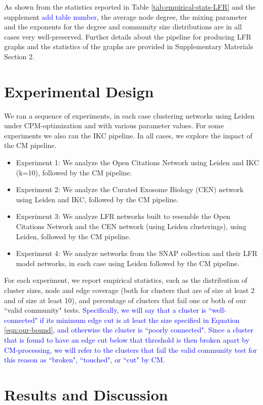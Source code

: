 \documentclass[11pt]{article}   	%
\begin{document}
As shown from the statistics reported in Table \ref{tab:empirical-stats-LFR} and the supplement \textcolor{blue}{add table number}, the average node degree, the mixing parameter and the exponents for the degree and community size distributions are in all cases very well-preserved. Further details about the pipeline for producing LFR graphs and the statistics of the graphs are provided in Supplementary Materials Section 2.

\section{Experimental Design}
\label{sec:expt-design}
We ran a sequence of experiments, in each case clustering networks using Leiden under CPM-optimization and with various parameter values. For some experiments we also ran the IKC pipeline.  In all cases, we explore the impact of the CM pipeline.
\begin{itemize}
\item Experiment 1: We analyze the Open Citations Network using Leiden  and IKC (k=10), followed by the CM pipeline.
\item Experiment 2: We analyze the Curated Exosome Biology (CEN) network using Leiden and IKC, followed by the CM pipeline.
\item Experiment 3: We analyze LFR networks built to resemble the Open Citations Network and the CEN network (using Leiden clusterings), using Leiden, followed by the CM pipeline.
\item Experiment 4: We analyze networks from the SNAP collection and their LFR model networks, in each case using Leiden followed by the CM pipeline.
\end{itemize}

For each experiment, we report empirical statistics, such as the distribution of cluster sizes, node and edge coverage (both for clusters that are of size at least 2 and of size at least 10), and percentage of clusters that fail one  or both of our ``valid community" tests.
\textcolor{blue}{Specifically, we will say that a cluster is ``well-connected" if its minimum edge cut is at least the size specified in
 Equation \ref{eqn:our-bound}, and otherwise the cluster is ``poorly connected". 
 Since a cluster that is found to have an edge cut below that threshold is then broken apart by CM-processing, we will refer
 to the clusters that fail the valid community test for this reason as ``broken", ``touched", or ``cut" by CM.}


\section{Results and Discussion}
\label{sec:results-discussion}
\end{document}
